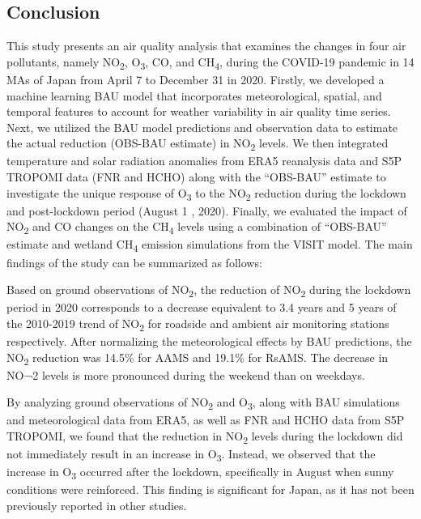 \subsection{Conclusion} \label{chap4_conclusion}
This study presents an air quality analysis that examines the changes in four air pollutants, namely NO\textsubscript{2}, O\textsubscript{3}, CO, and CH\textsubscript{4}, during the COVID-19 pandemic in 14 MAs of Japan from April 7 to December 31 in 2020. Firstly, we developed a machine learning BAU model that incorporates meteorological, spatial, and temporal features to account for weather variability in air quality time series. Next, we utilized the BAU model predictions and observation data to estimate the actual reduction (OBS-BAU estimate) in NO\textsubscript{2} levels. We then integrated temperature and solar radiation anomalies from ERA5 reanalysis data and S5P TROPOMI data (FNR and HCHO) along with the “OBS-BAU” estimate to investigate the unique response of O\textsubscript{3} to the NO\textsubscript{2} reduction during the lockdown and post-lockdown period (August 1 , 2020). Finally, we evaluated the impact of NO\textsubscript{2} and CO changes on the CH\textsubscript{4} levels using a combination of “OBS-BAU” estimate and wetland CH\textsubscript{4} emission simulations from the VISIT model. The main findings of the study can be summarized as follows:\par
Based on ground observations of NO\textsubscript{2}, the reduction of NO\textsubscript{2} during the lockdown period in 2020 corresponds to a decrease equivalent to 3.4 years and 5 years of the 2010-2019 trend of NO\textsubscript{2} for roadside and ambient air monitoring stations respectively. After normalizing the meteorological effects by BAU predictions, the NO\textsubscript{2} reduction was 14.5\% for AAMS and 19.1\% for RsAMS. The decrease in NO¬2 levels is more pronounced during the weekend than on weekdays.\par
By analyzing ground observations of NO\textsubscript{2} and O\textsubscript{3}, along with BAU simulations and meteorological data from ERA5, as well as FNR and HCHO data from S5P TROPOMI, we found that the reduction in NO\textsubscript{2} levels during the lockdown did not immediately result in an increase in O\textsubscript{3}. Instead, we observed that the increase in O\textsubscript{3} occurred after the lockdown, specifically in August when sunny conditions were reinforced. This finding is significant for Japan, as it has not been previously reported in other studies.\par
